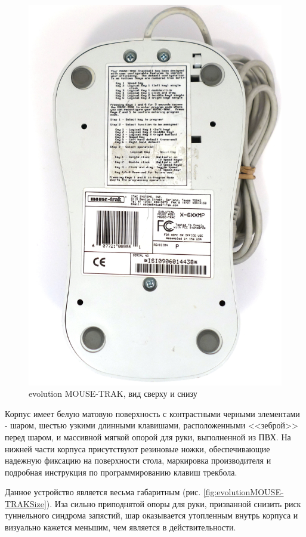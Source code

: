 \documentclass[11pt, a4paper]{article}
\begin{document}
\begin{figure}[h]
    \includegraphics[scale=0.35]{1997_mousetrak_evolution/bottom_60.jpg}
    \caption{evolution MOUSE-TRAK, вид сверху и снизу}
     \label{fig:evolutionMOUSE-TRAKTopBottom}
\end{figure}

Корпус имеет белую матовую поверхность с контрастными черными элементами - шаром, шестью узкими длинными клавишами, расположенными <<зеброй>> перед шаром, и массивной мягкой опорой для руки, выполненной из ПВХ. На нижней части корпуса присутствуют резиновые ножки, обеспечивающие надежную фиксацию на поверхности стола, маркировка производителя и подробная инструкция по программированию клавиш трекбола.

Данное устройство является весьма габаритным (рис. \ref{fig:evolutionMOUSE-TRAKSize}). Иза сильно приподнятой опоры для руки, призванной снизить риск туннельного синдрома запястий, шар оказывается утопленным внутрь корпуса и визуально кажется меньшим, чем является в действительности.
\end{document}
